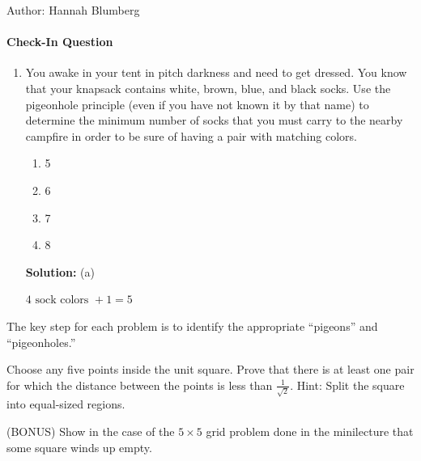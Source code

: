 \documentclass[solution, letterpaper]{cs20inclass}
\begin{document}

\noindent Author: Hannah Blumberg%

\paragraph*{Check-In Question}
\begin{enumerate}

\item
You awake in your tent in pitch darkness and need to get dressed. You know that your knapsack contains white, brown, blue, and black socks. Use the pigeonhole principle (even if you have not known it by that name) to determine the minimum number of socks that you must carry to the nearby campfire in order to be sure of having a pair with matching colors.
\begin{enumerate}
\item 5
\item 6
\item 7
\item 8
\end{enumerate}

\textbf{Solution:} (a)

$4\text{ sock colors } + 1 = 5$

\end{enumerate}

\problem

The key step for each problem is to identify the appropriate ``pigeons'' and ``pigeonholes.''

\subproblem Choose any five points inside the unit square. Prove that there is at least one pair for which the distance between the points is less than $\frac{1}{\sqrt{2}}$. Hint: Split the square into equal-sized regions.

\subproblem (BONUS) Show in the case of the $5\times5$ grid problem done in the minilecture that some square winds up empty.
\end{document}
